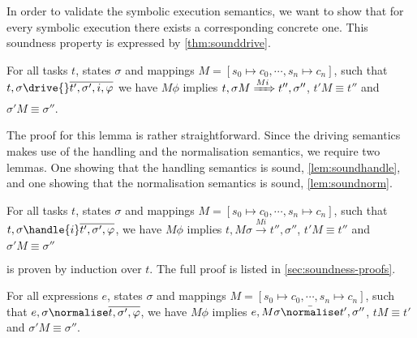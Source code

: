 %

In order to validate the symbolic execution semantics, we want to show that for every symbolic execution there exists a corresponding concrete one.
This soundness property is expressed by \cref{thm:sounddrive}.

\begin{theorem}
  \label{thm:sounddrive}

  For all tasks $t$, states $\sigma$ and mappings $M=[s_0\mapsto c_0,\cdots,s_n\mapsto c_n]$,
  such that $t,\sigma\drive{} \overline{t',\sigma',i,\phi}$
  we have $M\phi$ implies
  $t,\sigma M \xRightarrow[]{M i} t'',\sigma''$, $t'M \equiv t''$ and $\sigma' M \equiv \sigma''$.
\end{theorem}

The proof for this lemma is rather straightforward.
Since the driving semantics makes use of the handling and the normalisation semantics, we require two lemmas.
One showing that the handling semantics is sound, \cref{lem:soundhandle}, and one showing that the normalisation semantics is sound, \cref{lem:soundnorm}.

\begin{lemma}
  \label{lem:soundhandle}

  For all tasks $t$, states $\sigma$ and mappings $M = [s_0\mapsto c_0,\cdots,s_n\mapsto c_n]$,
  such that $t,\sigma\handle{i} \overline{t',\sigma',\phi}$,
  we have $M\phi$ implies
  $t,M \sigma \xrightarrow[]{M i} t'',\sigma''$, $t'M \equiv t'' $ and $\sigma' M \equiv \sigma''$
\end{lemma}

 is proven by induction over $t$.
The full proof is listed in \cref{sec:soundness-proofs}.

\begin{lemma}
  \label{lem:soundnorm}

  For all expressions $e$, states $\sigma$ and mappings $M=[s_0\mapsto c_0,\cdots,s_n\mapsto c_n]$,
  such that $e,\sigma\normalise \overline{t,\sigma',\phi}$,
  we have $M\phi$ implies
  $e,M \sigma \bar{\normalise}t',\sigma''$, $t M \equiv t'$ and $\sigma' M \equiv \sigma''$.

\end{lemma}

